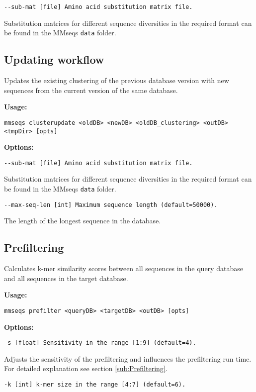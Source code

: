 \documentclass[11pt,a4paper]{report}
\begin{document}
\texttt{\small -{}-sub-mat {[}file{]} Amino acid substitution matrix
file.}{\small \par}

Substitution matrices for different sequence diversities in the required
format can be found in the MMseqs \texttt{data} folder.


\subsection{Updating workflow}

Updates the existing clustering of the previous database version with
new sequences from the current version of the same database.

\textbf{Usage:}

\texttt{mmseqs clusterupdate <oldDB> <newDB> <oldDB\_clustering> <outDB>
<tmpDir> {[}opts{]}}

\textbf{Options:}

\texttt{\small -{}-sub-mat {[}file{]} Amino acid substitution matrix
file.}{\small \par}

Substitution matrices for different sequence diversities in the required
format can be found in the MMseqs \texttt{data} folder.

\texttt{\small -{}-max-seq-len {[}int{]} Maximum sequence length (default=50000).}{\small \par}

The length of the longest sequence in the database.


\subsection{Prefiltering}

Calculates k-mer similarity scores between all sequences in the query
database and all sequences in the target database.

\textbf{Usage:}

\texttt{mmseqs prefilter <queryDB> <targetDB> <outDB> {[}opts{]}}

\textbf{Options:}

\texttt{\small -s {[}float{]} Sensitivity in the range {[}1:9{]} (default=4).}{\small \par}

Adjusts the sensitivity of the prefiltering and influences the prefiltering
run time. For detailed explanation see section \ref{sub:Prefiltering}.

\texttt{\small -k {[}int{]} k-mer size in the range {[}4:7{]} (default=6).}{\small \par}
\end{document}
